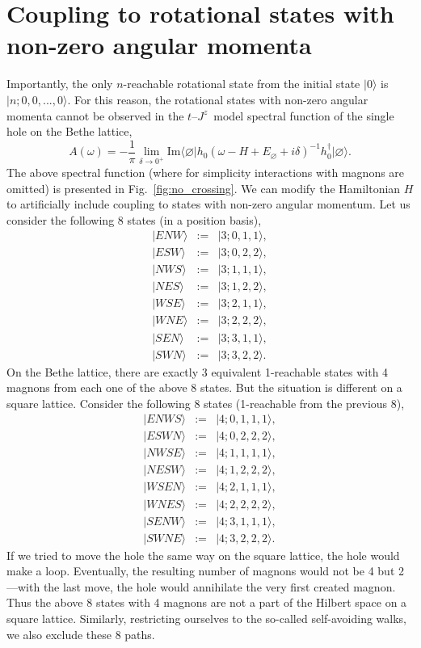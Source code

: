 \documentclass[11pt, a4paper, onecolumn]{article}
\newcommand{\ket}[1]{\vert #1 \rangle}
\newcommand{\bra}[1]{\langle #1 \vert}
\begin{document}
\section{Coupling to rotational states with non-zero angular momenta}
Importantly, the only $n$-reachable rotational state from the initial state $\ket{0}$ is $\ket{n;0,0,...,0}$. For this reason, the rotational states with non-zero angular momenta cannot be observed in the $t$--$J^z$~model spectral function of the single hole on the Bethe lattice,
\begin{equation}
	A(\omega) = -\frac{1}{\pi} \lim_{\delta \to 0^+}\mathrm{Im}\bra{\varnothing}h_{0}(\omega - H + E_{\varnothing} + i\delta)^{-1}h_{0}^{\dag}\ket{\varnothing}.
\end{equation}
The above spectral function (where for simplicity interactions with magnons are omitted) is presented in Fig.~\ref{fig:no_crossing}. We can modify the Hamiltonian $H$ to artificially include coupling to states with non-zero angular momentum. Let us consider the following 8 states (in a position basis),
\begin{eqnarray}
	\ket{ENW} &:=& \ket{3;0,1,1}, \\
	\ket{ESW} &:=& \ket{3;0,2,2}, \\
	\ket{NWS} &:=& \ket{3;1,1,1}, \\
	\ket{NES} &:=& \ket{3;1,2,2}, \\
	\ket{WSE} &:=& \ket{3;2,1,1}, \\
	\ket{WNE} &:=& \ket{3;2,2,2}, \\
	\ket{SEN} &:=& \ket{3;3,1,1}, \\
	\ket{SWN} &:=& \ket{3;3,2,2}.
\end{eqnarray}
On the Bethe lattice, there are exactly 3 equivalent 1-reachable states with 4 magnons from each one of the above 8 states. But the situation is different on a square lattice. Consider the following 8 states (1-reachable from the previous 8),
\begin{eqnarray}
	\ket{ENWS} &:=& \ket{4;0,1,1,1}, \\
	\ket{ESWN} &:=& \ket{4;0,2,2,2}, \\
	\ket{NWSE} &:=& \ket{4;1,1,1,1}, \\
	\ket{NESW} &:=& \ket{4;1,2,2,2}, \\
	\ket{WSEN} &:=& \ket{4;2,1,1,1}, \\
	\ket{WNES} &:=& \ket{4;2,2,2,2}, \\
	\ket{SENW} &:=& \ket{4;3,1,1,1}, \\
	\ket{SWNE} &:=& \ket{4;3,2,2,2}.
\end{eqnarray}
If we tried to move the hole the same way on the square lattice, the hole would make a loop. Eventually, the resulting number of magnons would not be 4 but 2---with the last move, the hole would annihilate the very first created magnon. Thus the above 8 states with 4 magnons are not a part of the Hilbert space on a square lattice. Similarly, restricting ourselves to the so-called self-avoiding walks, we also exclude these 8 paths. 
\end{document}
